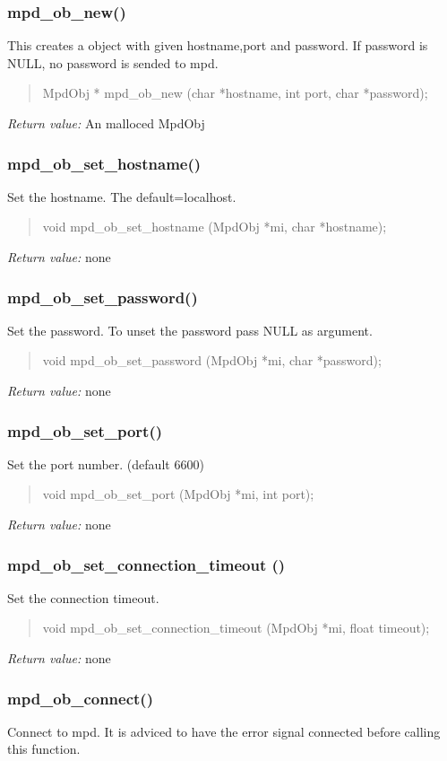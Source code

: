 \documentclass[a4paper,11pt]{article}
\begin{document}
	\subsubsection{mpd\_ob\_new()}
	This creates a object with given hostname,port and password. If password is NULL, no password is sended to mpd.
	\begin{quote}
	MpdObj * mpd\_ob\_new (char *hostname, int port, char *password); 
	\end{quote}
	\textit{Return value:} An malloced MpdObj
	\subsubsection{mpd\_ob\_set\_hostname()}
	Set the hostname. The default=localhost.
	\begin{quote}
	void mpd\_ob\_set\_hostname (MpdObj *mi, char *hostname); 
	\end{quote}
	\textit{Return value:} none
	
	\subsubsection{mpd\_ob\_set\_password()}
	Set the password. To unset the password pass NULL as argument.
	\begin{quote}
	void mpd\_ob\_set\_password (MpdObj *mi, char *password); 
	\end{quote}
	\textit{Return value:} none
	
	\subsubsection{mpd\_ob\_set\_port()}
	Set the port number. (default 6600)
 \begin{quote}
 void mpd\_ob\_set\_port (MpdObj *mi, int port); 
 \end{quote}
 \textit{Return value:} none
 
 \subsubsection{mpd\_ob\_set\_connection\_timeout ()}
 Set the connection timeout.
 \begin{quote}
 void mpd\_ob\_set\_connection\_timeout (MpdObj *mi, float timeout);
 \end{quote}
 \textit{Return value:} none
 \subsubsection{ mpd\_ob\_connect() }
 Connect to mpd. It is adviced to have the error signal connected before calling this function.\\
 
\end{document}

